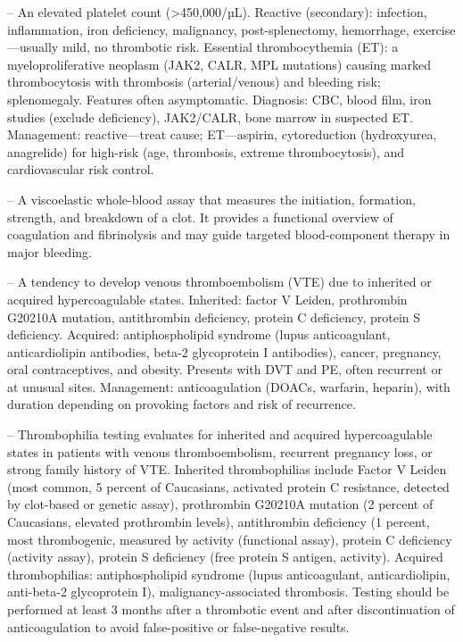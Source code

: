 -- An elevated platelet count (>450,000/µL). Reactive (secondary): infection, inflammation, iron deficiency, malignancy, post-splenectomy, hemorrhage, exercise—usually mild, no thrombotic risk. Essential thrombocythemia (ET): a myeloproliferative neoplasm (JAK2, CALR, MPL mutations) causing marked thrombocytosis with thrombosis (arterial/venous) and bleeding risk; splenomegaly. Features often asymptomatic. Diagnosis: CBC, blood film, iron studies (exclude deficiency), JAK2/CALR, bone marrow in suspected ET. Management: reactive—treat cause; ET—aspirin, cytoreduction (hydroxyurea, anagrelide) for high-risk (age, thrombosis, extreme thrombocytosis), and cardiovascular risk control.

-- A viscoelastic whole-blood assay that measures the initiation, formation, strength, and breakdown of a clot. It provides a functional overview of coagulation and fibrinolysis and may guide targeted blood-component therapy in major bleeding.

-- A tendency to develop venous thromboembolism (VTE) due to inherited or acquired hypercoagulable states. Inherited: factor V Leiden, prothrombin G20210A mutation, antithrombin deficiency, protein C deficiency, protein S deficiency. Acquired: antiphospholipid syndrome (lupus anticoagulant, anticardiolipin antibodies, beta-2 glycoprotein I antibodies), cancer, pregnancy, oral contraceptives, and obesity. Presents with DVT and PE, often recurrent or at unusual sites. Management: anticoagulation (DOACs, warfarin, heparin), with duration depending on provoking factors and risk of recurrence.

-- Thrombophilia testing evaluates for inherited and acquired hypercoagulable states in patients with venous thromboembolism, recurrent pregnancy loss, or strong family history of VTE. Inherited thrombophilias include Factor V Leiden (most common, 5 percent of Caucasians, activated protein C resistance, detected by clot-based or genetic assay), prothrombin G20210A mutation (2 percent of Caucasians, elevated prothrombin levels), antithrombin deficiency (1 percent, most thrombogenic, measured by activity (functional assay), protein C deficiency (activity assay), protein S deficiency (free protein S antigen, activity). Acquired thrombophilias: antiphospholipid syndrome (lupus anticoagulant, anticardiolipin, anti-beta-2 glycoprotein I), malignancy-associated thrombosis. Testing should be performed at least 3 months after a thrombotic event and after discontinuation of anticoagulation to avoid false-positive or false-negative results.

